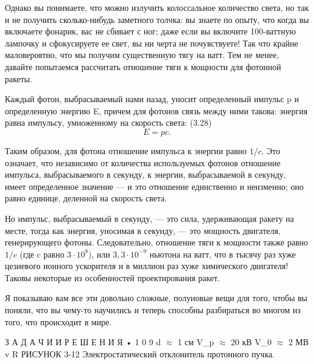 \documentclass[10pt,oneside]{article}
\newcommand{\TipsSubsection}[1]{\par\vspace{6bp}{\normalsize\bfseries #1\par}\vspace{2bp}}
\begin{document}
\TipsSubsection{3-7 Фотонные ракеты Была предложена и другая ракета, основанная на том, что чем быстрее выбрасывается выхлоп, тем лучше. А почему бы не выбрасывать фотоны --- ведь это самое быстрое, что есть на свете, --- просто светить назад! Вы забираетесь в хвост ракеты, включаете карманный фонарик --- и получаете толчок!}

Однако вы понимаете, что можно излучить колоссальное количество света, но так и не получить сколько-нибудь заметного толчка: вы знаете по опыту, что когда вы включаете фонарик, вас не сбивает с ног; даже если вы включите 100-ваттную лампочку и сфокусируете ее свет, вы ни черта не почувствуете! Так что крайне маловероятно, что мы получим существенную тягу на ватт. Тем не менее, давайте попытаемся рассчитать отношение тяги к мощности для фотонной ракеты.\par

Каждый фотон, выбрасываемый нами назад, уносит определенный импульс p и определенную энергию E, причем для фотонов связь между ними такова: энергия равна импульсу, умноженному на скорость света: (3.28) \[E = pc.\]\par

Таким образом, для фотона отношение импульса к энергии равно \(1/c\). Это означает, что независимо от количества используемых фотонов отношение импульса, выбрасываемого в секунду, к энергии, выбрасываемой в секунду, имеет определенное значение --- и это отношение единственно и неизменно; оно равно единице, деленной на скорость света.\par

Но импульс, выбрасываемый в секунду, --- это сила, удерживающая ракету на месте, тогда как энергия, уносимая в секунду, --- это мощность двигателя, генерирующего фотоны. Следовательно, отношение тяги к мощности также равно \(1/c\) (где c равно \(3 \cdot 10^8\)), или \(3{,}3 \cdot 10^{-9}\) ньютона на ватт, что в тысячу раз хуже цезиевого ионного ускорителя и в миллион раз хуже химического двигателя! Таковы некоторые из особенностей проектирования ракет.\par

Я показываю вам все эти довольно сложные, полуновые вещи для того, чтобы вы поняли, что вы чему-то научились и теперь способны разбираться во многом из того, что происходит в мире.\par

З А Д А Ч И  И  Р Е Ш Е Н И Я • 1 0 9 d \ensuremath{\approx} 1 см V\_p \ensuremath{\approx} 20 кВ V\_0 \ensuremath{\approx} 2 МВ v R РИСУНОК 3-12 Электростатический отклонитель протонного пучка.\par
\end{document}
